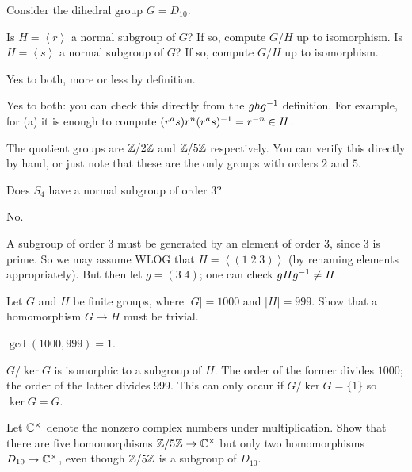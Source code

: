 \begin{problem}
	Consider the dihedral group $G = D_{10}$.
	\begin{enumerate}[(a)]
		\ii Is $H = \left< r \right>$ a normal subgroup of $G$?
		If so, compute $G/H$ up to isomorphism.
		\ii Is $H = \left< s \right>$ a normal subgroup of $G$?
		If so, compute $G/H$ up to isomorphism.
	\end{enumerate}
	\begin{hint}
		Yes to both, more or less by definition.
	\end{hint}
	\begin{sol}
		Yes to both: you can check this directly
		from the $ghg^{-1}$ definition.
		For example, for (a)
		it is enough to compute $(r^a s) r^n (r^a s)^{-1} = r^{-n} \in H$.

		The quotient groups are $\mathbb Z/2\mathbb Z$ and $\mathbb Z/5\mathbb Z$ respectively.
		You can verify this directly by hand,
		or just note that these are the only groups with orders $2$ and $5$.
	\end{sol}
\end{problem}

\begin{problem}
	Does $S_4$ have a normal subgroup of order $3$?
	\begin{hint}
		No.
	\end{hint}
	\begin{sol}
		A subgroup of order $3$ must be generated by
		an element of order $3$, since $3$ is prime.
		So we may assume WLOG that $H = \left< (1\; 2 \; 3) \right>$
		(by renaming elements appropriately).
		But then let $g = (3 \; 4)$; one can check $gHg^{-1} \ne H$.
	\end{sol}
\end{problem}

\begin{problem}
	Let $G$ and $H$ be finite groups, where $\left\lvert G \right\rvert = 1000$
	and $\left\lvert H \right\rvert = 999$.
	Show that a homomorphism $G \to H$ must be trivial.
	\begin{hint}
		$\gcd(1000,999)=1$.
	\end{hint}
	\begin{sol}
		$G/\ker G$ is isomorphic to a subgroup of $H$.
		The order of the former divides $1000$;
		the order of the latter divides $999$.
		This can only occur if $G / \ker G = \{1\}$
		so $\ker G = G$.
	\end{sol}
\end{problem}

\begin{problem}
	Let $\mathbb C^\times$ denote the nonzero complex numbers under multiplication.
	Show that there are five homomorphisms $\mathbb Z/5\mathbb Z \to \mathbb C^\times$
	but only two homomorphisms $D_{10} \to \mathbb C^\times$,
	even though $\mathbb Z/5\mathbb Z$ is a subgroup of $D_{10}$.
\end{problem}

